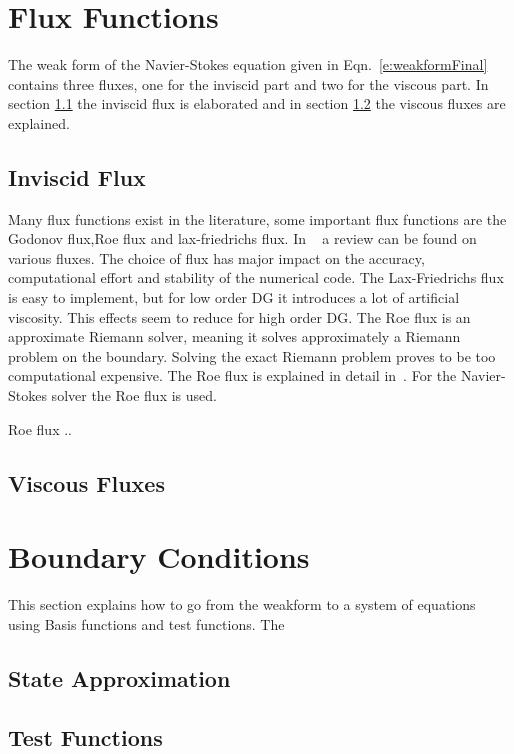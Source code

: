 \documentclass{report}
\begin{document}
\section{Flux Functions}
\label{s:fluxFunctions}
The weak form of the Navier-Stokes equation given in Eqn.~\ref{e:weakformFinal} contains three fluxes, one for the inviscid part and two for the viscous part. In section \ref{ss:Inviscidflux} the inviscid flux is elaborated and in section \ref{ss:ViscousFluxes} the viscous fluxes are explained.

\subsection{Inviscid Flux}
\label{ss:Inviscidflux}
Many flux functions exist in the literature, some important flux functions are the Godonov flux,Roe flux and lax-friedrichs flux. In ~\cite{} a review can be found on various fluxes. The choice of flux has major impact on the accuracy, computational effort and stability of the numerical code. The Lax-Friedrichs flux is easy to implement, but for low order DG it introduces a lot of artificial viscosity. This effects seem to reduce for high order DG. The Roe flux is an approximate Riemann solver, meaning it solves approximately a Riemann problem on the boundary. Solving the exact Riemann problem proves to be too computational expensive. The Roe flux is explained in detail in~\cite{}. For the Navier-Stokes solver the Roe flux is used.

Roe flux ..

\subsection{Viscous Fluxes}
\label{ss:ViscousFluxes}


\section{Boundary Conditions}
This section explains how to go from the weakform to a system of equations using Basis functions and test functions. The

\subsection{State Approximation}

\subsection{Test Functions}
\end{document}
